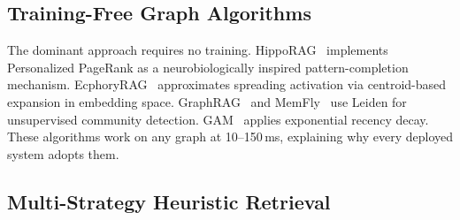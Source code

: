 \documentclass[hf]{ceurart}
\begin{document}
\subsection{Training-Free Graph Algorithms}

The dominant approach requires no training.
HippoRAG~\cite{hipporag2024} implements Personalized PageRank as a
neurobiologically inspired pattern-completion mechanism.
EcphoryRAG~\cite{ecphoryrag2026} approximates spreading activation
via centroid-based expansion in embedding space.
GraphRAG~\cite{graphrag2024} and MemFly~\cite{memfly2026} use Leiden
for unsupervised community detection. GAM~\cite{gam2026} applies
exponential recency decay. These algorithms work on any graph at
10--150\,ms, explaining why every deployed system adopts them.

\subsection{Multi-Strategy Heuristic Retrieval}
\end{document}
